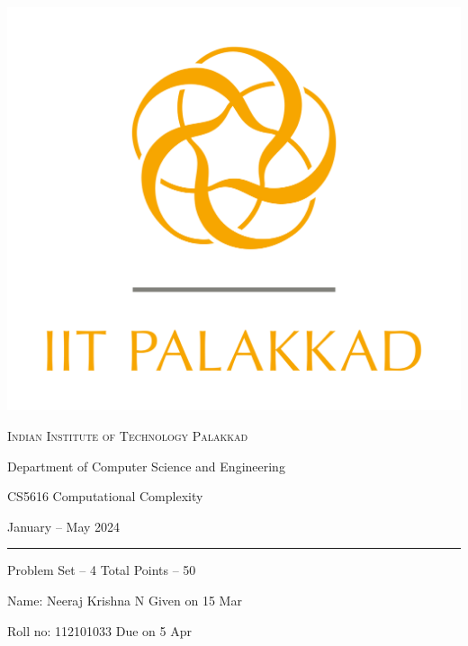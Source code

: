 \documentclass[12pt, a4paper,answers]{exam}
\begin{document}
	\noindent
	\begin{minipage}[l]{0.1\textwidth}
		\noindent
		\includegraphics[width=2.4\textwidth]{iitpkd}
	\end{minipage}
	\hfill
	\begin{minipage}[c]{0.8\textwidth}
		\begin{center}
			{\large \textsc{\textcolor{iitpkdcolor}{Indian Institute of Technology Palakkad}} \par
				\small	Department of Computer Science and Engineering	\par
				\large	CS5616 Computational Complexity \par 
				\small January -- May 2024}
		\end{center}
	\end{minipage}
	\par
\vspace{2mm}
\hrule
\vspace{2mm}
\begin{minipage}{0.9\textwidth} 
	\textsf{Problem Set} -- 4  \hfill  \textsf{Total Points} -- 50
	
	{\small \textsf{Name}: Neeraj Krishna N    \hfill \small \textsf{Given on} 15 Mar}
	
	{\small \textsf{Roll no}: 112101033  \hfill \small \textsf{Due on} 5 Apr}
\end{minipage}
	\vspace{0.2in}
\noindent
\end{document}
